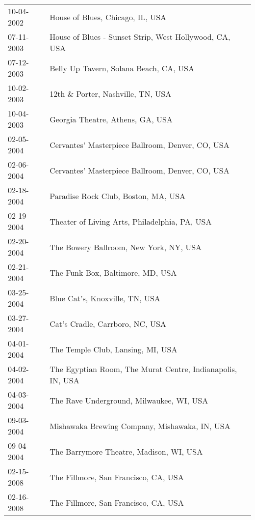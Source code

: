 \begin{supertabular}{ll}
 10-04-2002 &                            House of Blues, Chicago, IL, USA \\
 07-11-2003 &      House of Blues - Sunset Strip, West Hollywood, CA, USA \\
 07-12-2003 &                      Belly Up Tavern, Solana Beach, CA, USA \\
 10-02-2003 &                           12th \& Porter, Nashville, TN, USA \\
 10-04-2003 &                            Georgia Theatre, Athens, GA, USA \\
 02-05-2004 &            Cervantes' Masterpiece Ballroom, Denver, CO, USA \\
 02-06-2004 &            Cervantes' Masterpiece Ballroom, Denver, CO, USA \\
 02-18-2004 &                         Paradise Rock Club, Boston, MA, USA \\
 02-19-2004 &               Theater of Living Arts, Philadelphia, PA, USA \\
 02-20-2004 &                      The Bowery Ballroom, New York, NY, USA \\
 02-21-2004 &                            The Funk Box, Baltimore, MD, USA \\
 03-25-2004 &                              Blue Cat's, Knoxville, TN, USA \\
 03-27-2004 &                             Cat's Cradle, Carrboro, NC, USA \\
 04-01-2004 &                           The Temple Club, Lansing, MI, USA \\
 04-02-2004 &  The Egyptian Room, The Murat Centre, Indianapolis, IN, USA \\
 04-03-2004 &                    The Rave Underground, Milwaukee, WI, USA \\
 09-03-2004 &               Mishawaka Brewing Company, Mishawaka, IN, USA \\
 09-04-2004 &                     The Barrymore Theatre, Madison, WI, USA \\
 02-15-2008 &                        The Fillmore, San Francisco, CA, USA \\
 02-16-2008 &                        The Fillmore, San Francisco, CA, USA \\
\end{supertabular}
